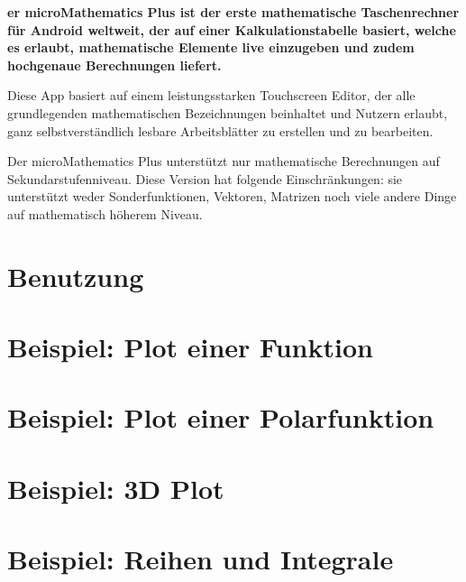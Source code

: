 \documentclass[DIV=calc, paper=a4, fontsize=11pt, twocolumn]{scrartcl}
\begin{document}
\maketitle
\thispagestyle{fancy} %

\textbf{er microMathematics Plus ist der erste mathematische
Taschenrechner für Android weltweit, der auf einer Kalkulationstabelle basiert,
welche es erlaubt, mathematische Elemente live einzugeben und zudem hochgenaue
Berechnungen liefert.}

\begin{bf}
Diese App basiert auf einem leistungsstarken Touchscreen Editor, der alle
grundlegenden mathematischen Bezeichnungen beinhaltet und Nutzern erlaubt, ganz
selbstverständlich lesbare Arbeitsblätter zu erstellen und zu bearbeiten.

Der microMathematics Plus unterstützt nur mathematische Berechnungen auf
Sekundarstufenniveau. Diese Version hat folgende Einschränkungen: sie
unterstützt weder Sonderfunktionen, Vektoren, Matrizen noch viele andere Dinge
auf mathematisch höherem Niveau.
\end{bf}

\section{Benutzung}


\section{Beispiel: Plot einer Funktion}


\section{Beispiel: Plot einer Polarfunktion}


\section{Beispiel: 3D Plot}


\section{Beispiel: Reihen und Integrale}

\end{document}
